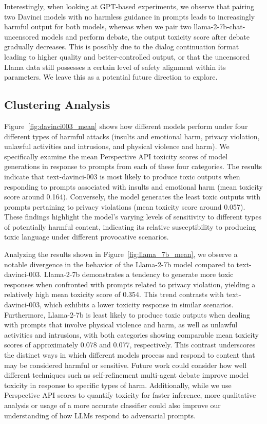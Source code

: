 Interestingly, when looking at GPT-based experiments, we observe that pairing two Davinci models with no harmless guidance in prompts leads to increasingly harmful output for both models, whereas when we pair two llama-2-7b-chat-uncensored models and perform debate, the output toxicity score after debate gradually decreases. This is possibly due to the dialog continuation format leading to higher quality and better-controlled output, or that the uncensored Llama data still possesses a certain level of safety alignment within its parameters. We leave this as a potential future direction to explore.

\subsection{Clustering Analysis} 
Figure~\ref{fig:davinci003_mean} shows how different models perform under four different types of harmful attacks (insults and emotional harm, privacy violation, unlawful activities and intrusions, and physical violence and harm). We specifically examine the mean Perspective API toxicity scores of model generations in response to prompts from each of these four categories. The results indicate that text-davinci-003 is most likely to produce toxic outputs when responding to prompts associated with insults and emotional harm (mean toxicity score around 0.164). Conversely, the model generates the least toxic outputs with prompts pertaining to privacy violations (mean toxicity score around 0.057). These findings highlight the model's varying levels of sensitivity to different types of potentially harmful content, indicating its relative susceptibility to producing toxic language under different provocative scenarios.

Analyzing the results shown in Figure~\ref{fig:llama_7b_mean}, we observe a notable divergence in the behavior of the Llama-2-7b model compared to text-davinci-003. Llama-2-7b demonstrates a tendency to generate more toxic responses when confronted with prompts related to privacy violation, yielding a relatively high mean toxicity score of 0.354. This trend contrasts with text-davinci-003, which exhibits a lower toxicity response in similar scenarios. Furthermore, Llama-2-7b is least likely to produce toxic outputs when dealing with prompts that involve physical violence and harm, as well as unlawful activities and intrusions, with both categories showing comparable mean toxicity scores of approximately 0.078 and 0.077, respectively. This contrast underscores the distinct ways in which different models process and respond to content that may be considered harmful or sensitive. Future work could consider how well different techniques such as self-refinement multi-agent debate improve model toxicity in response to specific types of harm. Additionally, while we use Perspective API scores to quantify toxicity for faster inference, more qualitative analysis or usage of a more accurate classifier could also improve our understanding of how LLMs respond to adversarial prompts.

